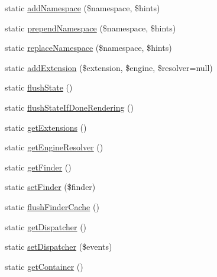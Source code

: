 \begin{DoxyCompactItemize}
\item 
static \mbox{\hyperlink{class_illuminate_1_1_support_1_1_facades_1_1_view_a96dccf56ebb9af33ac164415fc47f7d9}{add\+Namespace}} (\$namespace, \$hints)
\item 
static \mbox{\hyperlink{class_illuminate_1_1_support_1_1_facades_1_1_view_ac22f88ed92d4db5dfa581d66f3a591f0}{prepend\+Namespace}} (\$namespace, \$hints)
\item 
static \mbox{\hyperlink{class_illuminate_1_1_support_1_1_facades_1_1_view_a8068e527ac2a8000115f060dd9759f85}{replace\+Namespace}} (\$namespace, \$hints)
\item 
static \mbox{\hyperlink{class_illuminate_1_1_support_1_1_facades_1_1_view_a40632186ece06ab9074020abfa7f12c6}{add\+Extension}} (\$extension, \$engine, \$resolver=null)
\item 
static \mbox{\hyperlink{class_illuminate_1_1_support_1_1_facades_1_1_view_a35ba488f299cb991e9623b13caccf22b}{flush\+State}} ()
\item 
static \mbox{\hyperlink{class_illuminate_1_1_support_1_1_facades_1_1_view_a24bcfca77006fcddae2d1fe606008555}{flush\+State\+If\+Done\+Rendering}} ()
\item 
static \mbox{\hyperlink{class_illuminate_1_1_support_1_1_facades_1_1_view_a05cec9f8ba9bb41f4856a8bdf6d4b520}{get\+Extensions}} ()
\item 
static \mbox{\hyperlink{class_illuminate_1_1_support_1_1_facades_1_1_view_ae4c107f942672578fe7db9f2064bba66}{get\+Engine\+Resolver}} ()
\item 
static \mbox{\hyperlink{class_illuminate_1_1_support_1_1_facades_1_1_view_aa4ad5200e49edd6e761d7eafe230858b}{get\+Finder}} ()
\item 
static \mbox{\hyperlink{class_illuminate_1_1_support_1_1_facades_1_1_view_af4edf9aacb36a505652d79806dabc5be}{set\+Finder}} (\$finder)
\item 
static \mbox{\hyperlink{class_illuminate_1_1_support_1_1_facades_1_1_view_a7af78f678f917e319b1128e3aca41541}{flush\+Finder\+Cache}} ()
\item 
static \mbox{\hyperlink{class_illuminate_1_1_support_1_1_facades_1_1_view_ab92f407c5e15745967f923af17d12eee}{get\+Dispatcher}} ()
\item 
static \mbox{\hyperlink{class_illuminate_1_1_support_1_1_facades_1_1_view_accb266b41c040a323095897aed18f57b}{set\+Dispatcher}} (\$events)
\item 
static \mbox{\hyperlink{class_illuminate_1_1_support_1_1_facades_1_1_view_aeb9289b44564bdeee64ddd4516ff8b34}{get\+Container}} ()

\end{DoxyCompactItemize}
